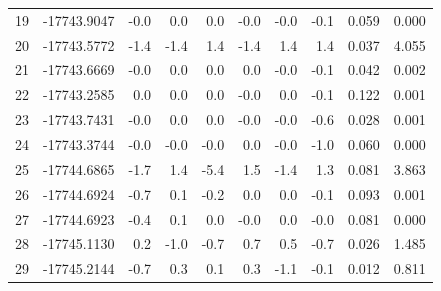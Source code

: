 \begin{longtable}{@{}crrrrrrrrr@{}}
19 & -17743.9047 & \textcolor{blue!20}{-0.0} & \textcolor{red!20}{0.0} & \textcolor{red!20}{0.0} & \textcolor{blue!20}{-0.0} & \textcolor{blue!20}{-0.0} & \textcolor{blue!21}{-0.1} & 0.059 & 0.000 \\
20 & -17743.5772 & \textcolor{blue!40}{-1.4} & \textcolor{blue!40}{-1.4} & \textcolor{red!40}{1.4} & \textcolor{blue!40}{-1.4} & \textcolor{red!40}{1.4} & \textcolor{red!39}{1.4} & 0.037 & 4.055 \\
21 & -17743.6669 & \textcolor{blue!20}{-0.0} & \textcolor{red!20}{0.0} & \textcolor{red!20}{0.0} & \textcolor{red!20}{0.0} & \textcolor{blue!20}{-0.0} & \textcolor{blue!21}{-0.1} & 0.042 & 0.002 \\
22 & -17743.2585 & \textcolor{red!20}{0.0} & \textcolor{red!20}{0.0} & \textcolor{red!20}{0.0} & \textcolor{blue!20}{-0.0} & \textcolor{red!20}{0.0} & \textcolor{blue!21}{-0.1} & 0.122 & 0.001 \\
23 & -17743.7431 & \textcolor{blue!20}{-0.0} & \textcolor{red!20}{0.0} & \textcolor{red!20}{0.0} & \textcolor{blue!20}{-0.0} & \textcolor{blue!20}{-0.0} & \textcolor{blue!28}{-0.6} & 0.028 & 0.001 \\
24 & -17743.3744 & \textcolor{blue!20}{-0.0} & \textcolor{blue!20}{-0.0} & \textcolor{blue!20}{-0.0} & \textcolor{red!20}{0.0} & \textcolor{blue!20}{-0.0} & \textcolor{blue!33}{-1.0} & 0.060 & 0.000 \\
25 & -17744.6865 & \textcolor{blue!44}{-1.7} & \textcolor{red!39}{1.4} & \textcolor{blue!95}{-5.4} & \textcolor{red!40}{1.5} & \textcolor{blue!39}{-1.4} & \textcolor{red!37}{1.3} & 0.081 & 3.863 \\
26 & -17744.6924 & \textcolor{blue!29}{-0.7} & \textcolor{red!22}{0.1} & \textcolor{blue!22}{-0.2} & \textcolor{red!20}{0.0} & \textcolor{red!20}{0.0} & \textcolor{blue!21}{-0.1} & 0.093 & 0.001 \\
27 & -17744.6923 & \textcolor{blue!25}{-0.4} & \textcolor{red!20}{0.1} & \textcolor{red!20}{0.0} & \textcolor{blue!20}{-0.0} & \textcolor{red!20}{0.0} & \textcolor{blue!20}{-0.0} & 0.081 & 0.000 \\
28 & -17745.1130 & \textcolor{red!22}{0.2} & \textcolor{blue!34}{-1.0} & \textcolor{blue!30}{-0.7} & \textcolor{red!30}{0.7} & \textcolor{red!27}{0.5} & \textcolor{blue!29}{-0.7} & 0.026 & 1.485 \\
29 & -17745.2144 & \textcolor{blue!29}{-0.7} & \textcolor{red!24}{0.3} & \textcolor{red!21}{0.1} & \textcolor{red!24}{0.3} & \textcolor{blue!34}{-1.1} & \textcolor{blue!20}{-0.1} & 0.012 & 0.811 \\

\end{longtable}
